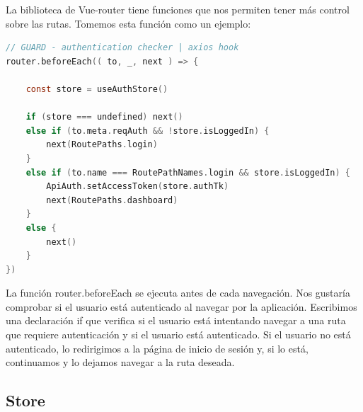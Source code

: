 La biblioteca de Vue-router tiene funciones que nos permiten tener más control sobre las rutas. Tomemos esta función como un ejemplo:

\begin{lstlisting}[language=C,caption={Función para controlar el acceso a rutas}, label={lst:routerAccess}]
// GUARD - authentication checker | axios hook
router.beforeEach(( to, _, next ) => {

    const store = useAuthStore() 

    if (store === undefined) next()
    else if (to.meta.reqAuth && !store.isLoggedIn) {
        next(RoutePaths.login)
    }
    else if (to.name === RoutePathNames.login && store.isLoggedIn) {            
        ApiAuth.setAccessToken(store.authTk)                                    
        next(RoutePaths.dashboard)
    }
    else {
        next()                                                                  
    }
})
\end{lstlisting}

La función router.beforeEach se ejecuta antes de cada navegación. Nos gustaría comprobar si el usuario está autenticado al navegar por la aplicación.
Escribimos una declaración if que verifica si el usuario está intentando navegar a una ruta que requiere autenticación y si el usuario está autenticado. Si el usuario no está autenticado, lo redirigimos a la página de inicio de sesión y, si lo está, continuamos y lo dejamos navegar a la ruta deseada.

\subsection{Store}
%

